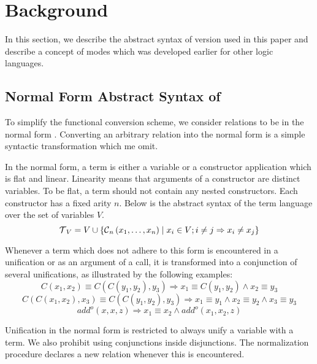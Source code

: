 \section{Background}

In this section, we describe the abstract syntax of \mk version used in this paper and describe a concept of modes which was developed earlier for other logic languages.

\subsection{Normal Form Abstract Syntax of \mk}

To simplify the functional conversion scheme, we consider \mk relations to be in the normal form .
Converting an arbitrary \mk relation into the normal form is a simple syntactic transformation which me omit.

In the normal form, a term is either a variable or a constructor application which is flat and linear.
Linearity means that arguments of a constructor are distinct variables.
To be flat, a term should not contain any nested constructors.
Each constructor has a fixed arity $n$.
Below is the abstract syntax of the term language over the set of variables $V$.
\[  \operatorname{\mathcal{T}}_{V} = V \cup \{\operatorname{\mathcal{C}}_{n}\left( x_1, \ldots, x_{n} \right) \mid x_{i}\in V; i \neq j \Rightarrow x_i \neq x_j\} \]

Whenever a term which does not adhere to this form is encountered in a unification or as an argument of a call, it is transformed into a conjunction of several unifications, as illustrated by the following examples:
\[ C\left( x_1, x_2 \right) \equiv C\left( C\left( y_1, y_2 \right), y_3 \right) \Rightarrow x_1 \equiv C\left( y_1, y_2 \right) \land x_2 \equiv y_3   \]
\[ C\left( C\left( x_1, x_2 \right), x_3 \right) \equiv C\left( C\left( y_1, y_2 \right), y_3 \right) \Rightarrow x_1 \equiv y_1 \land x_2 \equiv y_2 \land x_3 \equiv y_3   \]
\[add^o\left( x, x, z \right) \Rightarrow x_1 \equiv x_2 \land add^o\left( x_1, x_2, z \right) \]

Unification in the normal form is restricted to always unify a variable with a term.
We also prohibit using conjunctions inside disjunctions.
The normalization procedure declares a new relation whenever this is encountered.


